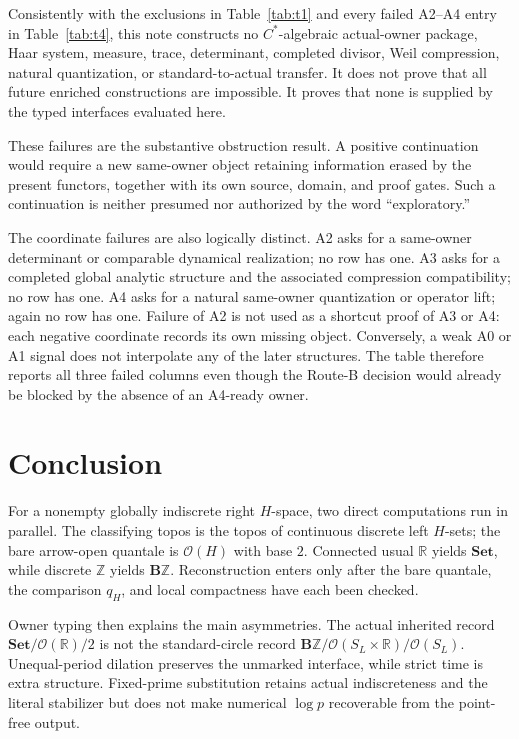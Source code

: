 \documentclass[12pt]{article}
\theoremstyle{definition}
\newcommand{\B}{\mathbf B}
\newcommand{\Ocal}{\mathcal O}
\newcommand{\R}{\mathbb R}
\newcommand{\Z}{\mathbb Z}
\newcommand{\Set}{\mathbf{Set}}
\begin{document}
Consistently with the exclusions in Table~\ref{tab:t1} and every failed A2--A4 entry in Table~\ref{tab:t4}, this note constructs no $C^*$-algebraic actual-owner package, Haar system, measure, trace, determinant, completed divisor, Weil compression, natural quantization, or standard-to-actual transfer.  It does not prove that all future enriched constructions are impossible.  It proves that none is supplied by the typed interfaces evaluated here.

These failures are the substantive obstruction result.  A positive continuation would require a new same-owner object retaining information erased by the present functors, together with its own source, domain, and proof gates.  Such a continuation is neither presumed nor authorized by the word ``exploratory.''

The coordinate failures are also logically distinct.  A2 asks for a same-owner determinant or comparable dynamical realization; no row has one.  A3 asks for a completed global analytic structure and the associated compression compatibility; no row has one.  A4 asks for a natural same-owner quantization or operator lift; again no row has one.  Failure of A2 is not used as a shortcut proof of A3 or A4: each negative coordinate records its own missing object.  Conversely, a weak A0 or A1 signal does not interpolate any of the later structures.  The table therefore reports all three failed columns even though the Route-B decision would already be blocked by the absence of an A4-ready owner.

\section{Conclusion}

For a nonempty globally indiscrete right $H$-space, two direct computations run in parallel.  The classifying topos is the topos of continuous discrete left $H$-sets; the bare arrow-open quantale is $\Ocal(H)$ with base $2$.  Connected usual $\R$ yields $\Set$, while discrete $\Z$ yields $\B\Z$.  Reconstruction enters only after the bare quantale, the comparison $q_H$, and local compactness have each been checked.

Owner typing then explains the main asymmetries.  The actual inherited record $\Set/\Ocal(\R)/2$ is not the standard-circle record $\B\Z/\Ocal(S_L\times\R)/\Ocal(S_L)$.  Unequal-period dilation preserves the unmarked interface, while strict time is extra structure.  Fixed-prime substitution retains actual indiscreteness and the literal stabilizer but does not make numerical $\log p$ recoverable from the point-free output.
\end{document}
